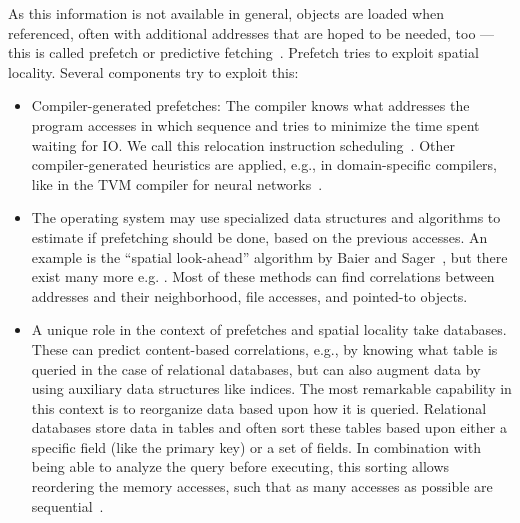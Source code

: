     As this information is not available in general, objects are loaded when referenced, often with additional addresses that are hoped to be needed, too --- this is called prefetch or predictive fetching~\autocite{stallings2012operating, jacob2010memory}. 
    Prefetch tries to exploit spatial locality. Several components try to exploit this:
    \begin{itemize}
     \item Compiler-generated prefetches: 
     The compiler knows what addresses the program accesses in which sequence and tries to minimize the time spent waiting for IO. 
     We call this relocation instruction scheduling~\autocite{aho1986compilers}. 
     Other compiler-generated heuristics are applied, e.g., in domain-specific compilers, like in the TVM compiler for neural networks~\autocite{chen2018tvm}.
     
     \item The operating system may use specialized data structures and algorithms to estimate if prefetching should be done, based on the previous accesses. 
     An example is the ``spatial look-ahead'' algorithm by Baier and Sager~\autocite{jacob2010memory, baier1976dynamic}, but there exist many more e.g. \autocite{joseph1999prefetching, griffioen1994reducing, kroeger1997exploring, cooksey2002stateless}. 
     Most of these methods can find correlations between addresses and their neighborhood, file accesses, and pointed-to objects.
     
     \item A unique role in the context of prefetches and spatial locality take databases. 
     These can predict content-based correlations, e.g., by knowing what table is queried in the case of relational databases, but can also augment data by using auxiliary data structures like indices. 
     The most remarkable capability in this context is to reorganize data based upon how it is queried.
     Relational databases store data in tables and often sort these tables based upon either a specific field (like the primary key) or a set of fields. 
     In combination with being able to analyze the query before executing, this sorting allows reordering the memory accesses, such that as many accesses as possible are sequential~\autocite{ramakrishnan2000database, silberschatz1997database}.
    \end{itemize}
    

